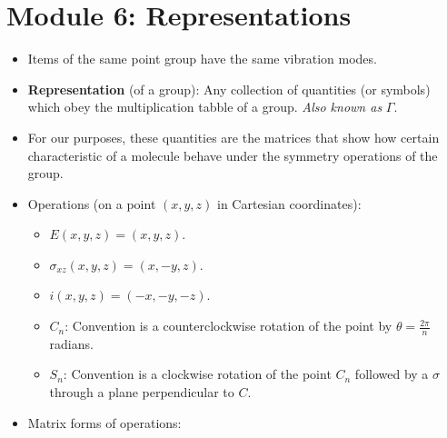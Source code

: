 \documentclass[../main.tex]{subfiles}
\begin{document}
\section{Module 6: Representations}
\begin{itemize}
    \item Items of the same point group have the same vibration modes.
    \item \textbf{Representation} (of a group): Any collection of quantities (or symbols) which obey the multiplication tabble of a group. \emph{Also known as} $\Gamma$.
    \item For our purposes, these quantities are the matrices that show how certain characteristic of a molecule behave under the symmetry operations of the group.
    \item Operations (on a point $(x,y,z)$ in Cartesian coordinates):
    \begin{itemize}
        \item $E(x,y,z)=(x,y,z)$.
        \item $\sigma_{xz}(x,y,z)=(x,-y,z)$.
        \item $i(x,y,z)=(-x,-y,-z)$.
        \item $C_n$: Convention is a counterclockwise rotation of the point by $\theta=\frac{2\pi}{n}$ radians.
        \item $S_n$: Convention is a clockwise rotation of the point $C_n$ followed by a $\sigma$ through a plane perpendicular to $C$.
    \end{itemize}
    \item Matrix forms of operations:
\end{itemize}
\end{document}
